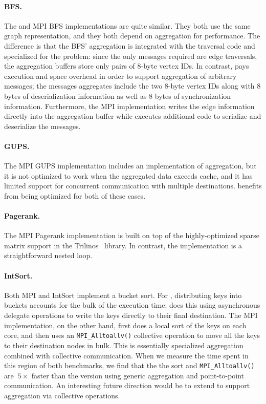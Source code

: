 \paragraph{BFS.}
The \Grappa and MPI BFS implementations are quite similar. They both
use the same graph representation, and they both depend on aggregation
for performance. The difference is that the BFS' aggregation is
integrated with the traversal code and specialized for the problem:
since the only messages required are edge traversals, the aggregation
buffers store only pairs of 8-byte vertex IDs.  In contrast, \Grappa
pays execution and space overhead in order to support aggregation of
arbitrary messages; the messages \Grappa aggregates include the two
8-byte vertex IDs along with 8 bytes of deserialization information as
well as 8 bytes of synchronization information. Furthermore, the MPI
implementation writes the edge information directly into the
aggregation buffer while \Grappa executes additional code to serialize
and deserialize the messages.

\paragraph{GUPS.}
The MPI GUPS implementation includes an implementation of aggregation,
but it is not optimized to work when the aggregated data exceeds
cache, and it has limited support for concurrent communication with
multiple destinations. \Grappa benefits from being optimized for both
of these cases.

\paragraph{Pagerank.}
The MPI Pagerank implementation is built on top of the
highly-optimized sparse matrix support in the Trilinos~\cite{trilinos}
library. In contrast, the \Grappa implementation is a straightforward nested
loop.

\paragraph{IntSort.}
Both MPI and \Grappa IntSort implement a bucket sort. For \Grappa,
distributing keys into buckets accounts for the bulk of the execution
time; \Grappa does this using asynchronous delegate operations to
write the keys directly to their final destination. The MPI
implementation, on the other hand, first does a local sort of the keys
on each core, and then uses an \texttt{MPI\_Alltoallv()} collective
operation to move all the keys to their destination nodes in
bulk. This is essentially specialized aggregation combined with
collective communication. When we measure the time spent in this
region of both benchmarks, we find that the the sort and
\texttt{MPI\_Alltoallv()} are $~5\times$ faster than the \Grappa
version using generic aggregation and point-to-point communication. An
interesting future direction would be to extend \Grappa to support
aggregation via collective operations.



